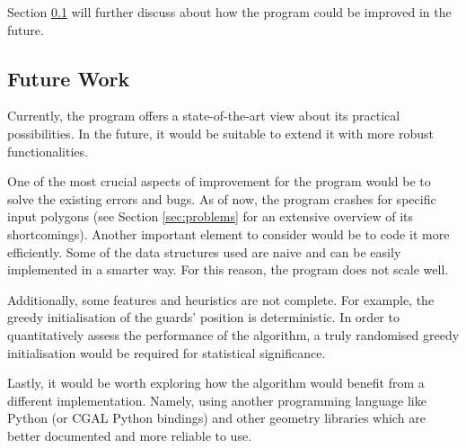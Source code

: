 Section \ref{sec:future} will further discuss about how the program could be improved in the future.




\subsection{Future Work}
\label{sec:future}
Currently, the program offers a state-of-the-art view about its practical possibilities.
In the future, it would be suitable to extend it with more robust functionalities.

One of the most crucial aspects of improvement for the program would be to solve the existing errors and bugs. As of now, the program crashes for specific input polygons (see Section \ref{sec:problems} for an extensive overview of its shortcomings). Another important element to consider would be to code it more efficiently. Some of the data structures used are naive and can be easily implemented in a smarter way. For this reason, the program does not scale well. 

Additionally, some features and heuristics are not complete. For example, the greedy initialisation of the guards' position is deterministic. In order to quantitatively assess the performance of the algorithm, a truly randomised greedy initialisation would be required for statistical significance.

Lastly, it would be worth exploring how the algorithm would benefit from a different implementation. Namely, using another programming language like Python (or CGAL Python bindings) and other geometry libraries which are better documented and more reliable to use.
